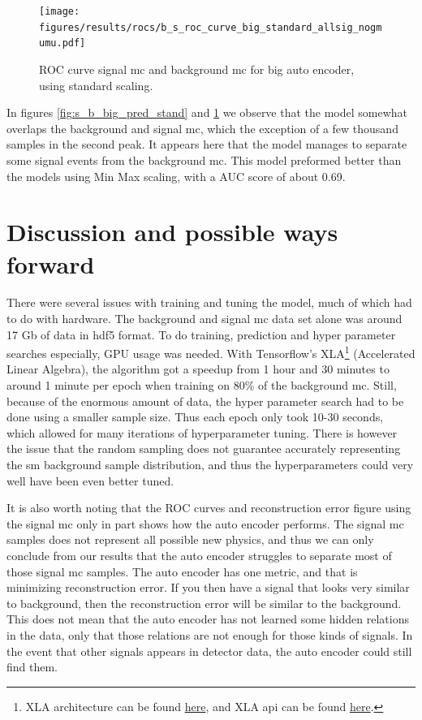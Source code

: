 \documentclass[ reprint, amsmath,amssymb, aps, nofootinbib]{revtex4-2}
\begin{document}
\begin{figure}[H]
    \centering
         \texttt{[image: figures/results/rocs/b\_s\_roc\_curve\_big\_standard\_allsig\_nogmumu.pdf]}
         \caption{ROC curve signal mc and background mc for big auto encoder, using standard scaling.}
         \label{fig:s_b_big_roc_stand}
\end{figure}



In figures \ref{fig:s_b_big_pred_stand} and \ref{fig:s_b_big_roc_stand} we observe that the model somewhat overlaps the background and signal mc, which the exception of a few thousand samples in the second peak. It appears here that the model manages to separate some signal events from the background mc. This model preformed better than the models using Min Max scaling, with a AUC score of about 0.69. \par 

\section{Discussion and possible ways forward}
There were several issues with training and tuning the model, much of which had to do with hardware. The background and signal mc data set alone was around 17 Gb of data in hdf5 format. To do training, prediction and hyper parameter searches especially, GPU usage was needed. With Tensorflow's XLA\footnote{XLA architecture can be found \href{https://www.tensorflow.org/xla/architecture}{here}, and XLA api can be found \href{https://www.tensorflow.org/xla}{here}.} (Accelerated Linear Algebra), the algorithm got a speedup from 1 hour and 30 minutes to around 1 minute per epoch when training on 80\% of the background mc. Still, because of the enormous amount of data, the hyper parameter search had to be done using a smaller sample size. Thus each epoch only took 10-30 seconds, which allowed for many iterations of hyperparameter tuning. There is however the issue that the random sampling does not guarantee accurately representing the sm background sample distribution, and thus the hyperparameters could very well have been even better tuned.  \par \par

It is also worth noting that the ROC curves and reconstruction error figure using the signal mc only in part shows how the auto encoder performs. The signal mc samples does not represent all possible new physics, and thus we can only conclude from our results that the auto encoder struggles to separate most of those signal mc samples. The auto encoder has one metric, and that is minimizing reconstruction error. If you then have a signal that looks very similar to background, then the reconstruction error will be similar to the background. This does not mean that the auto encoder has not learned some hidden relations in the data, only that those relations are not enough for those kinds of signals. In the event that other signals appears in detector data, the auto encoder could still find them. \par \par
\end{document}
